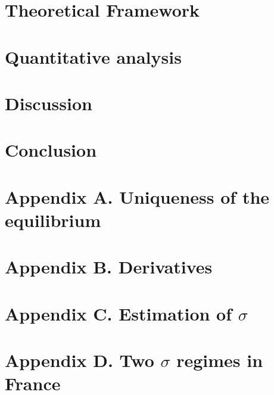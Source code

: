 \documentclass[12pt]{article}
\begin{document}
	\section{Theoretical Framework} \label{sec:model}
	
	
	\section{Quantitative analysis} \label{sec:quantitative_analysis}
	
	
	\section{Discussion} \label{sec:discussion}
	
	
	\section{Conclusion} \label{sec:conclusion}
	
	
	\clearpage
	\setlength\bibsep{0pt}
	
	
	
	\clearpage
	\onehalfspacing
	\appendix
	
	\section*{Appendix A. Uniqueness of the equilibrium} \label{appendix:uniqueness}
	
	
	\section*{Appendix B. Derivatives} \label{appendix:derivatives}
	

	\section*{Appendix C. Estimation of $\sigma$} \label{appendix:sigma}
	
	
	\section*{Appendix D. Two $\sigma$ regimes in France} \label{appendix:regime}
	
	
	
\end{document}
